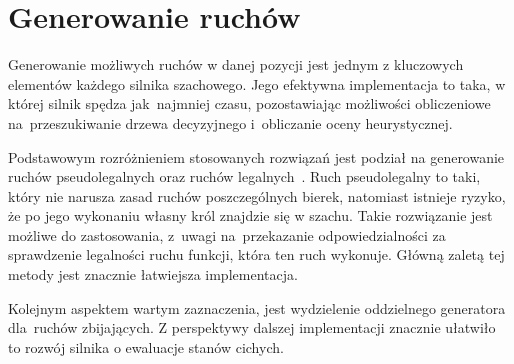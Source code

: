 \section{Generowanie ruchów}
\label{sec:generowanie-ruchow}

Generowanie możliwych ruchów w danej pozycji jest jednym z kluczowych elementów każdego silnika szachowego.
Jego efektywna implementacja to taka, w której silnik spędza jak~najmniej czasu, pozostawiając możliwości obliczeniowe na~przeszukiwanie drzewa decyzyjnego i~obliczanie oceny heurystycznej.

Podstawowym rozróżnieniem stosowanych rozwiązań jest podział na generowanie ruchów pseudolegalnych oraz ruchów legalnych~\cite*{wiki-movegen}.
Ruch pseudolegalny to taki, który nie narusza zasad ruchów poszczególnych bierek, natomiast istnieje ryzyko, że po jego wykonaniu własny król znajdzie się w szachu.
Takie rozwiązanie jest możliwe do zastosowania, z~uwagi na~przekazanie odpowiedzialności za sprawdzenie legalności ruchu funkcji, która ten ruch wykonuje.
Główną zaletą tej metody jest znacznie łatwiejsza implementacja.

Kolejnym aspektem wartym zaznaczenia, jest wydzielenie oddzielnego generatora dla~ruchów zbijających.
Z perspektywy dalszej implementacji znacznie ułatwiło to rozwój silnika o ewaluacje stanów cichych.




